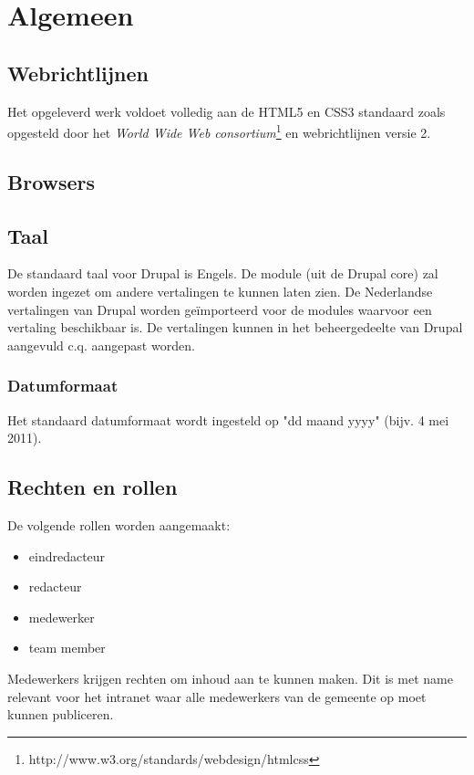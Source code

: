 \section{Algemeen}\label{algemeen}

\subsection{Webrichtlijnen}

Het opgeleverd werk voldoet volledig aan de HTML5 en CSS3 standaard zoals opgesteld door het \emph{World Wide Web consortium}\footnote{http://www.w3.org/standards/webdesign/htmlcss} en webrichtlijnen versie 2.

\subsection{Browsers}


\subsection{Taal}\label{taal}
De standaard taal voor Drupal is Engels. De  module (uit de Drupal core) zal worden ingezet om andere vertalingen te kunnen laten zien. De Nederlandse vertalingen van Drupal worden ge\"{i}mporteerd voor de modules waarvoor een vertaling beschikbaar is. De vertalingen kunnen in het beheergedeelte van Drupal aangevuld c.q. aangepast worden.

\subsubsection{Datumformaat}
Het standaard datumformaat wordt ingesteld op "dd maand yyyy" (bijv. 4 mei 2011).

\subsection{Rechten en rollen}\label{rollen}

De volgende rollen worden aangemaakt:
\begin{itemize}
\item eindredacteur
\item redacteur
\item medewerker
\item team member
\end{itemize}
Medewerkers krijgen rechten om inhoud aan te kunnen maken. Dit is met name relevant voor het intranet waar alle medewerkers van de gemeente op moet kunnen publiceren.

